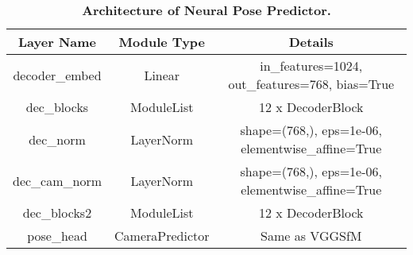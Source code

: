 \begin{table*}[h!]
\centering
\renewcommand{\arraystretch}{0.8} %
\setlength{\tabcolsep}{8pt} %
\caption{\textbf{Architecture of Neural Pose Predictor.}}
\begin{tabular}{ccc}
\toprule
\textbf{Layer Name} & \textbf{Module Type} & \textbf{Details} \\ \midrule
decoder\_embed & Linear & in\_features=1024, out\_features=768, bias=True \\
dec\_blocks & ModuleList & 12 x DecoderBlock \\
dec\_norm & LayerNorm & shape=(768,), eps=1e-06, elementwise\_affine=True \\
dec\_cam\_norm & LayerNorm & shape=(768,), eps=1e-06, elementwise\_affine=True \\
dec\_blocks2 & ModuleList & 12 x DecoderBlock \\
pose\_head & CameraPredictor & Same as VGGSfM \cite{wang2024vggsfm} \\
\bottomrule
\end{tabular}
\label{tab:neural_pose_predictor}
\end{table*}